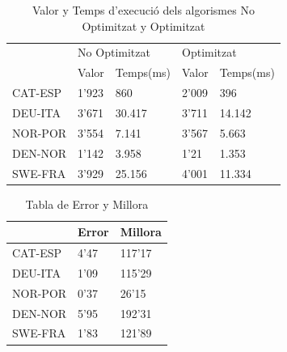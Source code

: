\documentclass[conference]{IEEEtran}
\begin{document}
\begin{table}[h]
\centering
\begin{tabular}{|l|l|l|l|l|}
\hline
 & \multicolumn{2}{l|}{No Optimitzat} & \multicolumn{2}{l|}{Optimitzat} \\
\cline{2-5}
 & Valor & Temps(ms) & Valor & Temps(ms) \\
\hline
CAT-ESP & 1'923 & 860 & 2'009 & 396 \\
DEU-ITA & 3'671 & 30.417 & 3'711 & 14.142 \\
NOR-POR & 3'554 & 7.141 & 3'567 & 5.663 \\
DEN-NOR & 1'142 & 3.958 & 1'21 & 1.353 \\
SWE-FRA & 3'929 & 25.156 & 4'001 & 11.334 \\
\hline
\end{tabular}
\caption{Valor y Temps d'execució dels algorismes No Optimitzat y Optimitzat}
\label{tab:no_opt_opt}
\end{table}

\begin{table}[h]
\centering
\begin{tabular}{|l|l|l|}
\hline
 & Error & Millora \\
\hline
CAT-ESP & 4'47 & 117'17 \\
DEU-ITA & 1'09 & 115'29 \\
NOR-POR & 0'37 & 26'15 \\
DEN-NOR & 5'95 & 192'31 \\
SWE-FRA & 1'83 & 121'89 \\
\hline
\end{tabular}
\caption{Tabla de Error y Millora}
\label{tab:error_millora}
\end{table}
\end{document}
